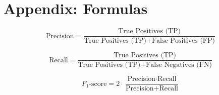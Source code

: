 \section{Appendix: Formulas} \label{app:formulas}
\[
\text{Precision} = \frac{\text{True Positives (TP)}}{\text{True Positives (TP)} + \text{False Positives (FP)}}
\]

\[
\text{Recall} = \frac{\text{True Positives (TP)}}{\text{True Positives (TP)} + \text{False Negatives (FN)}}
\]

\[
F_1\text{-score} = 2 \cdot \frac{\text{Precision} \cdot \text{Recall}}{\text{Precision} + \text{Recall}}
\]